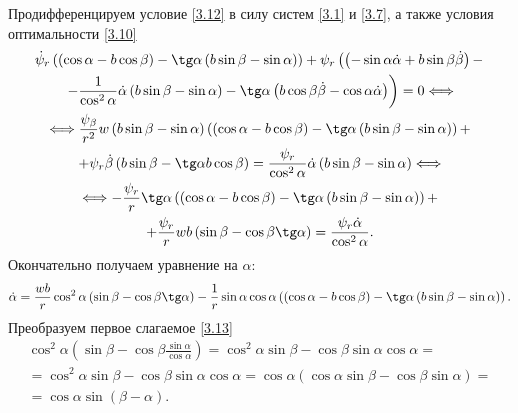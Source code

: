 \documentclass[a4paper,12pt, openany]{book}
\theoremstyle{plain} %
\theoremstyle{definition} %
\theoremstyle{remark} %
\numberwithin{equation}{chapter}
\begin{document}
{Продифференцируем условие \eqref{3.12} в силу систем \eqref{3.1} и \eqref{3.7}, а также условия оптимальности \eqref{3.10}
\begin{multline*}
\dot \psi _r \left( {\left( {\cos \alpha  - b\cos \beta } \right) - \tg\alpha \left( {b\sin \beta  - \sin \alpha } \right)} \right) + \psi _r \left( {\left( { - \sin \alpha \dot \alpha  + b\sin \beta \dot \beta } \right) - } \right. \\
\left. { - \frac{1}{{\cos ^2 \alpha }}\dot \alpha \left( {b\sin \beta  - \sin \alpha } \right) - \tg\alpha \left( {b\cos \beta \dot \beta  - \cos \alpha \dot \alpha } \right)} \right) = 0 \Longleftrightarrow \\
\Longleftrightarrow
\frac{{\psi _\beta  }}{{r^2 }}w\left( {b\sin \beta  - \sin \alpha } \right)\left( {\left( {\cos \alpha  - b\cos \beta } \right) - \tg\alpha \left( {b\sin \beta  - \sin \alpha } \right)} \right) + \\
 + \psi _r \dot \beta \left( {b\sin \beta  - \tg\alpha b\cos \beta } \right) = \frac{{\psi _r }}{{\cos ^2 \alpha }}\dot \alpha \left( {b\sin \beta  - \sin \alpha } \right) \Longleftrightarrow \\
 \Longleftrightarrow  - \frac{{\psi _r }}{r}\tg\alpha \left( {\left( {\cos \alpha  - b\cos \beta } \right) - \tg\alpha \left( {b\sin \beta  - \sin \alpha } \right)} \right) + \\
 + \frac{{\psi _r }}{r}wb\left( {\sin \beta  - \cos \beta \tg\alpha } \right) = \frac{{\psi _r \dot \alpha }}{{\cos ^2 \alpha }}.
\end{multline*}
Окончательно получаем уравнение на $\alpha$:
\begin{equation}\label{3.13}
\dot \alpha  = \frac{{wb}}{r}\cos ^2 \alpha \left( {\sin \beta  - \cos \beta \tg\alpha } \right) - \frac{1}{r}\sin \alpha \cos \alpha \left( {\left( {\cos \alpha  - b\cos \beta } \right) - \tg\alpha \left( {b\sin \beta  - \sin \alpha } \right)} \right).
\end{equation}
Преобразуем первое слагаемое \eqref{3.13}
\begin{multline*}
\cos ^2 \alpha \left( {\sin \beta  - \cos \beta \frac{{\sin \alpha }}{{\cos \alpha }}} \right) = \cos ^2 \alpha \sin \beta  - \cos \beta \sin \alpha \cos \alpha  = \\
 = \cos ^2 \alpha \sin \beta  - \cos \beta \sin \alpha \cos \alpha  = \cos \alpha \left( {\cos \alpha \sin \beta  - \cos \beta \sin \alpha } \right) = \\
 = \cos \alpha \sin \left( {\beta  - \alpha } \right).  
\end{multline*}
}
\end{document}
